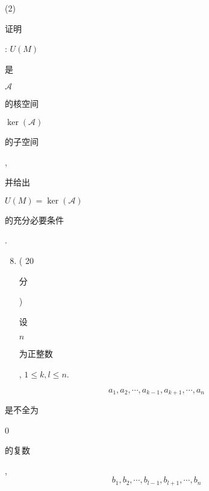 \documentclass[10pt]{article}
\begin{document}
(2) \begin{CJK}{UTF8}{mj}证明\end{CJK}: $U(M)$ \begin{CJK}{UTF8}{mj}是\end{CJK} $\mathscr{A}$ \begin{CJK}{UTF8}{mj}的核空间\end{CJK} $\operatorname{ker}(\mathscr{A})$ \begin{CJK}{UTF8}{mj}的子空间\end{CJK}, \begin{CJK}{UTF8}{mj}并给出\end{CJK} $U(M)=\operatorname{ker}(\mathscr{A})$ \begin{CJK}{UTF8}{mj}的充分必要条件\end{CJK}.

\begin{enumerate}
  \setcounter{enumi}{7}
  \item ( 20 \begin{CJK}{UTF8}{mj}分\end{CJK}) \begin{CJK}{UTF8}{mj}设\end{CJK} $n$ \begin{CJK}{UTF8}{mj}为正整数\end{CJK}, $1 \leqslant k, l \leqslant n$.
\end{enumerate}
$$
a_{1}, a_{2}, \cdots, a_{k-1}, a_{k+1}, \cdots, a_{n}
$$
\begin{CJK}{UTF8}{mj}是不全为\end{CJK} 0 \begin{CJK}{UTF8}{mj}的复数\end{CJK},
$$
b_{1}, b_{2}, \cdots, b_{l-1}, b_{l+1}, \cdots, b_{n}
$$
\end{document}
